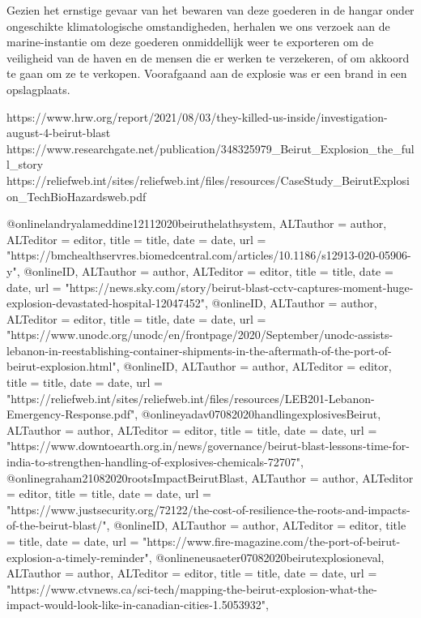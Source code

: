 {{{{{{{{{{{{{{Gezien het ernstige gevaar van het bewaren van deze goederen in de hangar onder ongeschikte klimatologische omstandigheden, herhalen we ons verzoek aan de marine-instantie om deze goederen onmiddellijk weer te exporteren om de veiligheid van de haven en de mensen die er werken te verzekeren, of om akkoord te gaan om ze te verkopen.
Voorafgaand aan de explosie was er een brand in een opslagplaats. 

https://www.hrw.org/report/2021/08/03/they-killed-us-inside/investigation-august-4-beirut-blast 
\cite{hrw03082021investigateBeirutBlast}
https://www.researchgate.net/publication/348325979_Beirut_Explosion_the_full_story 
\cite{souaibyElHussein112020Beirutstory}
https://reliefweb.int/sites/reliefweb.int/files/resources/CaseStudy_BeirutExplosion_TechBioHazardsweb.pdf 
\cite{ifrc2020chemicalexplosionBeirutPort}

@online{landryalameddine12112020beiruthelathsystem,	ALTauthor = {author},	ALTeditor = {editor},	title = {title},	date = {date},	url = {"https://bmchealthservres.biomedcentral.com/articles/10.1186/s12913-020-05906-y"},}
@online{ID,	ALTauthor = {author},	ALTeditor = {editor},	title = {title},	date = {date},	url = {"https://news.sky.com/story/beirut-blast-cctv-captures-moment-huge-explosion-devastated-hospital-12047452"},}
@online{ID,	ALTauthor = {author},	ALTeditor = {editor},	title = {title},	date = {date},	url = {"https://www.unodc.org/unodc/en/frontpage/2020/September/unodc-assists-lebanon-in-reestablishing-container-shipments-in-the-aftermath-of-the-port-of-beirut-explosion.html"},}
@online{ID,	ALTauthor = {author},	ALTeditor = {editor},	title = {title},	date = {date},	url = {"https://reliefweb.int/sites/reliefweb.int/files/resources/LEB201-Lebanon-Emergency-Response.pdf"},}
@online{yadav07082020handlingexplosivesBeirut,	ALTauthor = {author},	ALTeditor = {editor},	title = {title},	date = {date},	url = {"https://www.downtoearth.org.in/news/governance/beirut-blast-lessons-time-for-india-to-strengthen-handling-of-explosives-chemicals-72707"},}
@online{graham21082020rootsImpactBeirutBlast,	ALTauthor = {author},	ALTeditor = {editor},	title = {title},	date = {date},	url = {"https://www.justsecurity.org/72122/the-cost-of-resilience-the-roots-and-impacts-of-the-beirut-blast/"},}
@online{ID,	ALTauthor = {author},	ALTeditor = {editor},	title = {title},	date = {date},	url = {"https://www.fire-magazine.com/the-port-of-beirut-explosion-a-timely-reminder"},}
@online{neusaeter07082020beirutexplosioneval,	ALTauthor = {author},	ALTeditor = {editor},	title = {title},	date = {date},	url = {"https://www.ctvnews.ca/sci-tech/mapping-the-beirut-explosion-what-the-impact-would-look-like-in-canadian-cities-1.5053932"},}


}}}}}}}}}}}}}}
